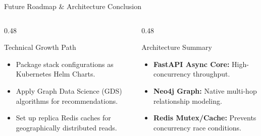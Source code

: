 \documentclass[aspectratio=169, 10pt]{beamer}
\begin{document}
\begin{frame}{Future Roadmap \& Architecture Conclusion}
  \begin{columns}[T]
    \begin{column}{0.48\textwidth}
      \begin{scard}{Technical Growth Path}
        \begin{itemize}
          \item Package stack configurations as Kubernetes Helm Charts.
          \item Apply Graph Data Science (GDS) algorithms for recommendations.
          \item Set up replica Redis caches for geographically distributed reads.
        \end{itemize}
      \end{scard}
    \end{column}
    \begin{column}{0.48\textwidth}
      \begin{scard}{Architecture Summary}
        \begin{itemize}
          \item \textbf{FastAPI Async Core:} High-concurrency throughput.
          \item \textbf{Neo4j Graph:} Native multi-hop relationship modeling.
          \item \textbf{Redis Mutex/Cache:} Prevents concurrency race conditions.
        \end{itemize}
      \end{scard}
    \end{column}
  \end{columns}
\end{frame}
\end{document}
